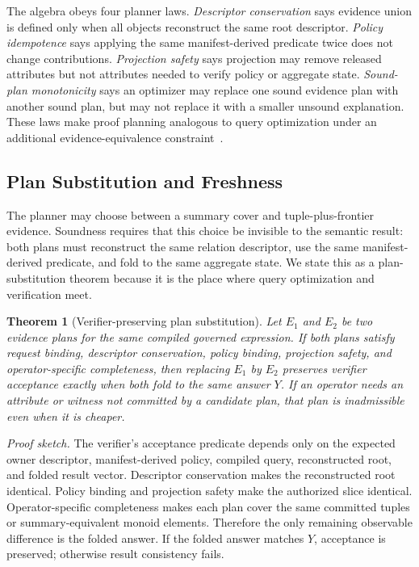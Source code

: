 \documentclass[conference]{IEEEtran}
\newtheorem{theorem}{Theorem}
\begin{document}
The algebra obeys four planner laws. \emph{Descriptor conservation} says evidence union is defined only when all objects reconstruct the same root descriptor. \emph{Policy idempotence} says applying the same manifest-derived predicate twice does not change contributions. \emph{Projection safety} says projection may remove released attributes but not attributes needed to verify policy or aggregate state. \emph{Sound-plan monotonicity} says an optimizer may replace one sound evidence plan with another sound plan, but may not replace it with a smaller unsound explanation. These laws make proof planning analogous to query optimization under an additional evidence-equivalence constraint~\cite{selinger1979access,graefe1993query,chaudhuri1998overview}.

\subsection{Plan Substitution and Freshness}
The planner may choose between a summary cover and tuple-plus-frontier evidence. Soundness requires that this choice be invisible to the semantic result: both plans must reconstruct the same relation descriptor, use the same manifest-derived predicate, and fold to the same aggregate state. We state this as a plan-substitution theorem because it is the place where query optimization and verification meet.

\begin{theorem}[Verifier-preserving plan substitution]
Let $E_1$ and $E_2$ be two evidence plans for the same compiled governed expression. If both plans satisfy request binding, descriptor conservation, policy binding, projection safety, and operator-specific completeness, then replacing $E_1$ by $E_2$ preserves verifier acceptance exactly when both fold to the same answer $Y$. If an operator needs an attribute or witness not committed by a candidate plan, that plan is inadmissible even when it is cheaper.
\end{theorem}

\noindent\emph{Proof sketch.} The verifier's acceptance predicate depends only on the expected owner descriptor, manifest-derived policy, compiled query, reconstructed root, and folded result vector. Descriptor conservation makes the reconstructed root identical. Policy binding and projection safety make the authorized slice identical. Operator-specific completeness makes each plan cover the same committed tuples or summary-equivalent monoid elements. Therefore the only remaining observable difference is the folded answer. If the folded answer matches $Y$, acceptance is preserved; otherwise result consistency fails.
\end{document}
